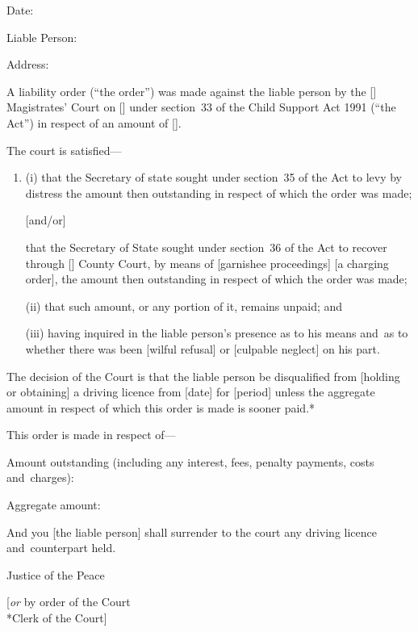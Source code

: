 \documentclass[12pt,a4paper]{article}
\begin{document}
\medskip

Date:

\medskip

Liable Person:

\medskip

Address:

\medskip

A liability order (``the order'') was made against the liable person by the [\phantom{Bolton}] Magistrates' Court on [\phantom{\today}] under section~33 of the Child Support Act 1991 (``the Act'') in respect of an amount of [\phantom{£100.00}].

The court is satisfied---
\begin{enumerate}
\item[]
(i) that the Secretary of state sought under section~35 of the Act to levy by distress the amount then outstanding in respect of which the order was made;

[and/or]

that the Secretary of State sought under section~36 of the Act to recover through [\phantom{Bolton}] County Court, by means of [garnishee proceedings] [a charging order], the amount then outstanding in respect of which the order was made;

(ii) that such amount, or any portion of it, remains unpaid; and

(iii) having inquired in the liable person's presence as to his means and~as to whether there was been [wilful refusal] or [culpable neglect] on his part.
\end{enumerate}

The decision of the Court is that the liable person be disqualified from [holding or obtaining] a driving licence from [date] for [period] unless the aggregate amount in respect of which this order is made is sooner paid.*

\medskip

This order is made in respect of---

Amount outstanding (including any interest, fees, penalty payments, costs and~charges):

\medskip

Aggregate amount:

\medskip

And you [the liable person] shall surrender to the court any driving licence and~counterpart held.

\medskip

{\raggedleft Justice of the Peace

\medskip

[\emph{or} by order of the Court\\*Clerk of the Court]

}
\end{document}

